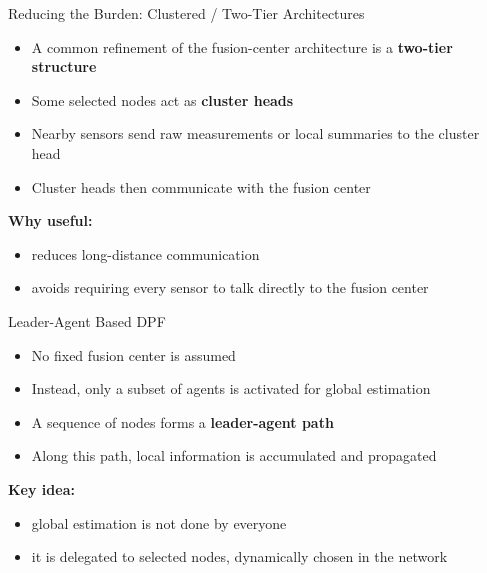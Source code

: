 \documentclass[aspectratio=169]{beamer}
\begin{document}

\begin{frame}{Reducing the Burden: Clustered / Two-Tier Architectures}

\begin{itemize}
    \item A common refinement of the fusion-center architecture is a \textbf{two-tier structure}
    \item Some selected nodes act as \textbf{cluster heads}
    \item Nearby sensors send raw measurements or local summaries to the cluster head
    \item Cluster heads then communicate with the fusion center
\end{itemize}

\vspace{0.3cm}

\textbf{Why useful:}
\begin{itemize}
    \item reduces long-distance communication
    \item avoids requiring every sensor to talk directly to the fusion center
\end{itemize}


\end{frame}


\begin{frame}{Leader-Agent Based DPF}

\begin{itemize}
    \item No fixed fusion center is assumed
    \item Instead, only a subset of agents is activated for global estimation
    \item A sequence of nodes forms a \textbf{leader-agent path}
    \item Along this path, local information is accumulated and propagated
\end{itemize}

\vspace{0.3cm}

\textbf{Key idea:}
\begin{itemize}
    \item global estimation is not done by everyone
    \item it is delegated to selected nodes, dynamically chosen in the network
\end{itemize}

\end{frame}
\end{document}
